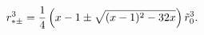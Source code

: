 \begin{equation}
r^{3}_{*\pm}={1\over 4}\left(
x-1\pm\sqrt{(x-1)^{2}-32 x}\right)\tilde{r}_{0}^{3}.
\label{eq:rastpm}
\end{equation}

